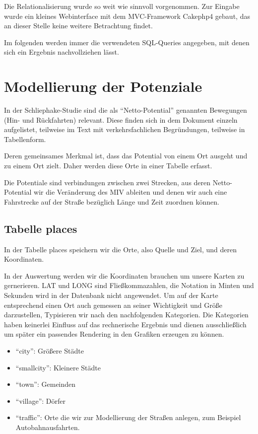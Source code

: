 \documentclass[fontsize=12pt,a4paper]{scrreprt}
\begin{document}
Die Relationalisierung wurde so weit wie sinnvoll vorgenommen. Zur Eingabe wurde ein kleines Webinterface mit dem MVC-Framework Cakephp4 gebaut, das an dieser Stelle keine weitere Betrachtung findet.

Im folgenden werden immer die verwendeten SQL-Queries angegeben, mit denen sich ein Ergebnis nachvollziehen lässt.

        \section{Modellierung der Potenziale}
In der Schliephake-Studie sind die als \enquote{Netto-Potential} genannten Bewegungen (Hin- und Rückfahrten) relevant. Diese finden sich in dem Dokument einzeln aufgelistet, teilweise im Text mit verkehrsfachlichen Begründungen, teilweise in Tabellenform.

Deren gemeinsames Merkmal ist, dass das Potential von einem Ort ausgeht und zu einem Ort zielt. Daher werden diese Orte in einer Tabelle erfasst.

Die Potentiale sind verbindungen zwischen zwei Strecken, aus deren Netto-Potential wir die Veränderung des MIV ableiten und denen wir auch eine Fahrstrecke auf der Straße bezüglich Länge und Zeit zuordnen können.
        \subsection{Tabelle places}
In der Tabelle places speichern wir die Orte, also Quelle und Ziel, und deren Koordinaten.

In der Auswertung werden wir die Koordinaten brauchen um unsere Karten zu gernerieren. LAT und LONG sind Fließkommazahlen, die Notation in Minten und Sekunden wird in der Datenbank nicht angewendet.
Um auf der Karte entsprechend einen Ort auch gemessen an seiner Wichtigkeit und Größe darzustellen, Typisieren wir nach den nachfolgenden Kategorien.
Die Kategorien haben keinerlei Einfluss auf das rechnerische Ergebnis und dienen ausschließlich um später ein passendes Rendering in den Grafiken erzeugen zu können.

\begin{itemize}
    \item \enquote{city}: Größere Städte
    \item \enquote{smallcity}: Kleinere Städte
    \item \enquote{town}: Gemeinden
    \item \enquote{village}: Dörfer
    \item \enquote{traffic}: Orte die wir zur Modellierung der Straßen anlegen, zum Beispiel Autobahnausfahrten.
\end{itemize}
\end{document}
